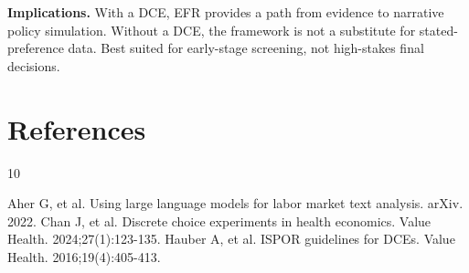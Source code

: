 \documentclass[12pt]{article}
\begin{document}
\textbf{Implications.} With a DCE, EFR provides a path from evidence to narrative policy simulation. Without a DCE, the framework is not a substitute for stated-preference data. Best suited for early-stage screening, not high-stakes final decisions.

\section*{References}

\begin{thebibliography}{10}

 Aher G, et al. Using large language models for labor market text analysis. arXiv. 2022.
 Chan J, et al. Discrete choice experiments in health economics. Value Health. 2024;27(1):123-135.
 Hauber A, et al. ISPOR guidelines for DCEs. Value Health. 2016;19(4):405-413.

\end{thebibliography}
\end{document}
